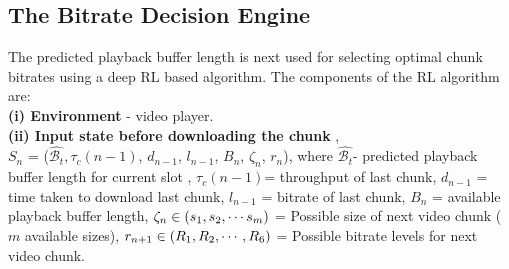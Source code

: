 \subsection{The Bitrate Decision Engine}
 \label{sec:bitrate_dec_engine}
The predicted playback buffer length is next used for selecting optimal chunk bitrates using a deep \ac{RL} based algorithm. The components of the \ac{RL} algorithm are:\\
\noindent\textbf{(i) Environment}   - video player.\\
\noindent\textbf{(ii) Input state before downloading the chunk }, \\$S_{n}$ = ($\hat{\mathcal{B}_t}, \tau_c(n-1)$, $d_{n-1}$, $l_{n-1}$, $B_{n}$, $\zeta_{n}$, $r_{n}$), where $\hat{\mathcal{B}_t}$- predicted playback buffer length for current slot , $\tau_c(n-1)$= throughput of last chunk, $d_{n-1}$ = time taken to download last chunk, $l_{n-1}$ = bitrate of last chunk, $B_{n}$ = available playback buffer length, $\zeta_{n}\in\left({s_1,s_2,\cdots s_m}\right)$ = Possible size of next video chunk  ($m$ available sizes), $r_{n+1}\in \left({R_1, R_2,\cdots, R_6}\right)$ = Possible bitrate levels for next video chunk.\\
